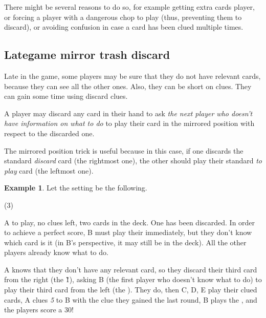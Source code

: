 \documentclass[a4paper]{article}
\theoremstyle{plain}
\theoremstyle{definition}
\newtheorem{example}[theorem]{Example}
\begin{document}
There might be several reasons to do so, for example getting extra cards player, or forcing a player with a dangerous chop to play (thus, preventing them to discard), or avoiding confusion in case a card has been clued multiple times.

\subsection{Lategame mirror trash discard}

Late in the game, some players may be sure that they do not have relevant cards, because they can see all the other ones. Also, they can be short on clues. They can gain some time using discard clues.

A player may discard any card in their hand to ask \textit{the next player who doesn't have information on what to do} to play their card in the mirrored position with respect to the discarded one.

The mirrored position trick is useful because in this case, if one discards the standard \textit{discard} card (the rightmost one), the other should play their standard \textit{to play} card (the leftmost one).

\begin{example}
	
	Let the setting be the following.
	
	\begin{tasks}(3)
		\task[+]      
		\task[A]    
		\task[B]    
		\task[C]    
		\task[D]    
		\task[E]    
	\end{tasks}
	
	A to play, no clues left, two cards in the deck. One  has been discarded. In order to achieve a perfect score, B must play their  immediately, but they don't know which card is it (in B's perspective, it may still be in the deck). All the other players already know what to do.
	
	A knows that they don't have any relevant card, so they discard their third card from the right (the \G{1}), asking B (the first player who doesn't know what to do) to play their third card from the left (the ). They do, then C, D, E play their clued cards, A clues \textit{5} to B with the clue they gained the last round, B plays the , and the players score a 30!
\end{example}
\end{document}
